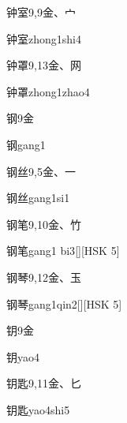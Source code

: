 \begin{Entry}{钟室}{9,9}{⾦、⼧}
  \begin{Phonetics}{钟室}{zhong1shi4}
  \end{Phonetics}
\end{Entry}

\begin{Entry}{钟罩}{9,13}{⾦、⽹}
  \begin{Phonetics}{钟罩}{zhong1zhao4}
  \end{Phonetics}
\end{Entry}

\begin{Entry}{钢}{9}{⾦}
  \begin{Phonetics}{钢}{gang1}
  \end{Phonetics}
\end{Entry}

\begin{Entry}{钢丝}{9,5}{⾦、⼀}
  \begin{Phonetics}{钢丝}{gang1si1}
  \end{Phonetics}
\end{Entry}

\begin{Entry}{钢笔}{9,10}{⾦、⽵}
  \begin{Phonetics}{钢笔}{gang1 bi3}[][HSK 5]
  \end{Phonetics}
\end{Entry}

\begin{Entry}{钢琴}{9,12}{⾦、⽟}
  \begin{Phonetics}{钢琴}{gang1qin2}[][HSK 5]
  \end{Phonetics}
\end{Entry}

\begin{Entry}{钥}{9}{⾦}
  \begin{Phonetics}{钥}{yao4}
  \end{Phonetics}
\end{Entry}

\begin{Entry}{钥匙}{9,11}{⾦、⼔}
  \begin{Phonetics}{钥匙}{yao4shi5}
  \end{Phonetics}
\end{Entry}

